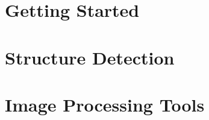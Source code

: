 \mainmatter
\setlength{\parindent}{0in}
 
\chapter{Getting Started}


\chapter{Structure Detection}


\chapter{Image Processing Tools}


\renewcommand{\bibname}{References}

\renewcommand*{\bibfont}{\sffamily} %
\printbibliography[heading=myheading]

%
%
